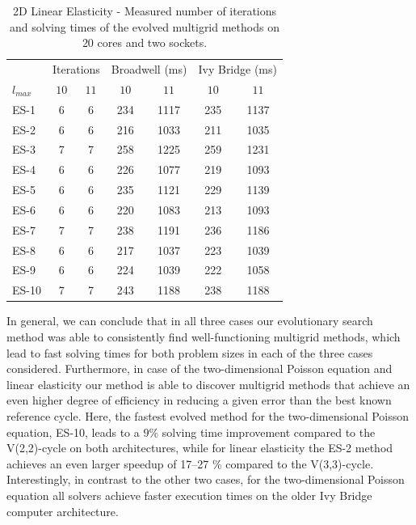 \begin{table}
	\caption{2D Linear Elasticity - Measured number of iterations and solving times of the evolved multigrid methods on 20 cores and two sockets.}
	\label{table:linear-elasticity-2D-evolved-methods}
	\centering
	\begin{tabular}{l c c c c c c}
		\toprule
		& \multicolumn{2}{c}{Iterations} & \multicolumn{2}{c}{Broadwell (ms)} & \multicolumn{2}{c}{Ivy Bridge (ms)} \\
		\cmidrule(r){2-3} \cmidrule(r){4-5} \cmidrule(r){6-7}
		$l_{max}$ & $10$& $11$ & $10$ & $11$ & $10$ & $11$\\
		\midrule
		ES-1 & 6 & 6 & 234 & 1117 & 235 & 1137 \\
		\midrule
		ES-2 & 6 & 6 & 216 & 1033 & 211 & 1035 \\
		\midrule
		ES-3 & 7 & 7 & 258 & 1225 & 259 & 1231 \\
		\midrule
		ES-4 & 6 & 6 & 226 & 1077 & 219 & 1093 \\
		\midrule
		ES-5 & 6 & 6 & 235 & 1121 & 229 & 1139 \\
		\midrule
		ES-6 & 6 & 6 & 220 & 1083 & 213 & 1093 \\
		\midrule
		ES-7 & 7 & 7 & 238 & 1191 & 236 & 1186 \\
		\midrule
		ES-8 & 6 & 6 & 217 & 1037 & 223 & 1039 \\
		\midrule
		ES-9 & 6 & 6 & 224 & 1039 & 222 & 1058 \\
		\midrule
		ES-10 & 7 & 7 & 243 & 1188 & 238 & 1188 \\
		\bottomrule
	\end{tabular}
\end{table}
In general, we can conclude that in all three cases our evolutionary search method was able to consistently find well-functioning multigrid methods, which lead to fast solving times for both problem sizes in each of the three cases considered.
Furthermore, in case of the two-dimensional Poisson equation and linear elasticity our method is able to discover multigrid methods that achieve an even higher degree of efficiency in reducing a given error than the best known reference cycle.
Here, the fastest evolved method for the two-dimensional Poisson equation, ES-10, leads to a $9 \%$ solving time improvement compared to the V(2,2)-cycle on both architectures, while for linear elasticity the ES-2 method achieves an even larger speedup of 17--27 \% compared to the V(3,3)-cycle.
Interestingly, in contrast to the other two cases, for the two-dimensional Poisson equation all solvers achieve faster execution times on the older Ivy Bridge computer architecture.
